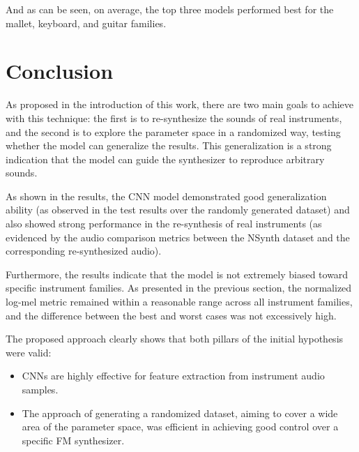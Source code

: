 \documentclass[sigconf,natbib=false]{acmart}
\begin{document}
And as can be seen, on average, the top three models performed best for the mallet, keyboard, and guitar families.

\section{Conclusion}
As proposed in the introduction of this work, there are two main goals to achieve with this technique: the first is to re-synthesize the sounds of real instruments, and the second is to explore the parameter space in a randomized way, testing whether the model can generalize the results. This generalization is a strong indication that the model can guide the synthesizer to reproduce arbitrary sounds.

As shown in the results, the CNN model demonstrated good generalization ability (as observed in the test results over the randomly generated dataset) and also showed strong performance in the re-synthesis of real instruments (as evidenced by the audio comparison metrics between the NSynth dataset and the corresponding re-synthesized audio).

Furthermore, the results indicate that the model is not extremely biased toward specific instrument families. As presented in the previous section, the normalized log-mel metric remained within a reasonable range across all instrument families, and the difference between the best and worst cases was not excessively high.

The proposed approach clearly shows that both pillars of the initial hypothesis were valid:
\begin{itemize}
\item CNNs are highly effective for feature extraction from instrument audio samples.
\item The approach of generating a randomized dataset, aiming to cover a wide area of the parameter space, was efficient in achieving good control over a specific FM synthesizer.
\end{itemize}
\end{document}
